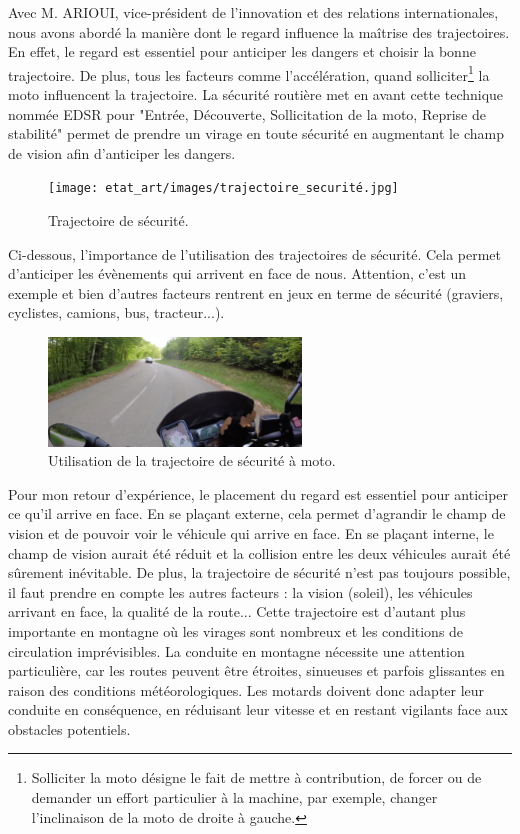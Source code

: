 Avec M. ARIOUI, vice-président de l’innovation et des relations internationales, nous avons abordé la manière dont le regard influence la maîtrise des trajectoires. En effet, le regard est essentiel pour anticiper les dangers et choisir la bonne trajectoire. De plus, tous les facteurs comme l'accélération, quand solliciter\footnote{Solliciter la moto désigne le fait de mettre à contribution, de forcer ou de demander un effort particulier à la machine, par exemple, changer l'inclinaison de la moto de droite à gauche.} la moto influencent la trajectoire. 
La sécurité routière\cite{trajectoire_securite} met en avant cette technique nommée EDSR pour "Entrée, Découverte, Sollicitation de la moto, Reprise de stabilité" permet de prendre un virage en toute sécurité en augmentant le champ de vision afin d'anticiper les dangers. 
\begin{figure}[H]
    \centering
    \texttt{[image: etat\_art/images/trajectoire\_securité.jpg]} 
    \caption{Trajectoire de sécurité.}
\end{figure}
Ci-dessous, l'importance de l'utilisation des trajectoires de sécurité. Cela permet d'anticiper les évènements qui arrivent en face de nous. Attention, c’est un exemple et bien d’autres facteurs rentrent en jeux en terme de sécurité  (graviers, cyclistes, camions, bus, tracteur...).
\begin{figure}[H]
    \centering
    \includegraphics[width=0.6\textwidth]{etat_art/images/morvan.png} 
    \caption{Utilisation de la trajectoire de sécurité à moto.}
\end{figure}
Pour mon retour d'expérience, le placement du regard est essentiel pour anticiper ce qu'il arrive en face. En se plaçant externe, cela permet d'agrandir le champ de vision et de pouvoir voir le véhicule qui arrive en face. En se plaçant interne, le champ de vision aurait été réduit et la collision entre les deux véhicules aurait été sûrement inévitable. De plus, la trajectoire de sécurité n'est pas toujours possible, il faut prendre en compte les autres facteurs : la vision (soleil), les véhicules arrivant en face, la qualité de la route...
Cette trajectoire est d'autant plus importante en montagne où les virages sont nombreux et les conditions de circulation imprévisibles. La conduite en montagne nécessite une attention particulière, car les routes peuvent être étroites, sinueuses et parfois glissantes en raison des conditions météorologiques. Les motards doivent donc adapter leur conduite en conséquence, en réduisant leur vitesse et en restant vigilants face aux obstacles potentiels.
